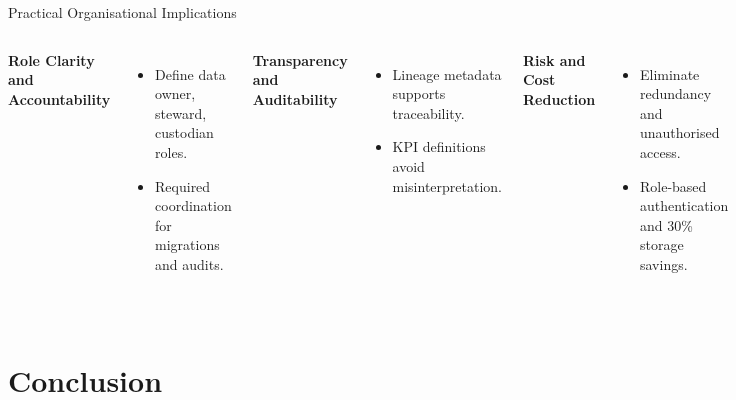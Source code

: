 \documentclass[aspectratio=169, table]{beamer}
\begin{document}
	\begin{frame}[fragile]{Practical Organisational Implications}
		\vspace{20pt}
		\begin{columns}
			\textbf{Role Clarity and Accountability}
			\begin{itemize}
				\item Define data owner, steward, custodian roles.
				\item Required coordination for migrations and audits.
			\end{itemize}
			
			\textbf{Transparency and Auditability}
			\begin{itemize}
				\item Lineage metadata supports traceability.
				\item KPI definitions avoid misinterpretation.
			\end{itemize}
			
			\textbf{Risk and Cost Reduction}
			\begin{itemize}
				\item Eliminate redundancy and unauthorised access.
				\item Role-based authentication and 30\% storage savings.
			\end{itemize}
			
			\textbf{Analytics Scalability}
			\begin{itemize}
				\item AI/ML teams use official data catalogue.
				\item Cloud platforms can be easily integrated because of standardisation and documentation.
			\end{itemize}
		\end{columns}
	\end{frame}
	
	\section{Conclusion}
	
\end{document}
